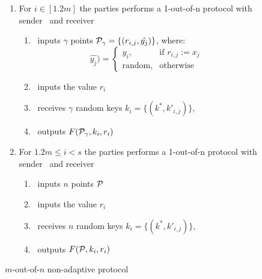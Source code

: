 \begin{figure}[h]
{\begin{minipage}{0.95\linewidth}
\begin{enumerate}
				\item For $i \in [1.2m]$  the parties performs a 1-out-of-n \OPPRF protocol with sender \SS\ and receiver \RR\
				\begin{enumerate}				
					\item \SS\ inputs $\gamma$ points $\P_\gamma=\{(r_{i,j}, \hat{y_j})\}$, where:					
					\[
					\hat{y_j})= 
					\begin{cases}
					y_i,& \text{if } r_{i,j}:=x_j\\
					\text{random},              & \text{otherwise}
					\end{cases}
					\]			
						\item \RR\ inputs the value $r_i$	
					\item \SS\ receives $\gamma$ random keys $k_i=\{(k^*,k'_{i,j})\}$, 
							
					\item \RR\ outputs $F( \P_\gamma,k_i, r_i)$
				\end{enumerate}
				
				\item For $ 1.2m \leq i < s$  the parties performs a 1-out-of-n \OPPRF protocol with sender \SS\ and receiver \RR\
				\begin{enumerate}
						\item \SS\ inputs $n$ points $\P$
						\item \RR\ inputs the value $r_i$ 
						\item \SS\ receives $n$ random keys $k_i=\{(k^*,k'_{i,j})\}$, 
					\item \RR\ outputs $F( \P,k_i, r_i)$	
				\end{enumerate}
				
			\end{enumerate}				
		\end{minipage}
	}
	\caption{$m$-out-of-$n$ non-adaptive \OPPRF protocol}
	\label{fig:Consnssot}
\end{figure}

\begin{table}\centering
	
	\caption{ Parameters used in . $n$ is the size of the parties' input sets; $\beta$ is the maximum bin size for simple hashing; $s$ is the maximum hash size for Cuckoo hashing}
	\label{tbl:params}
\end{table}

